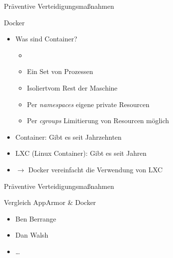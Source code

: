 \begin{frame}{Präventive Verteidigungsmaßnahmen}
        \begin{block}{Docker}
                \begin{itemize}[<+->]
                        \item Was sind Container?
                        \begin{itemize}[<+->]
                                \item \textbf{}
                                \item Ein Set von Prozessen
                                \item Isoliert\footnotemark vom Rest der Maschine
                                \item Per \textit{namespaces} eigene private Resourcen
                                \item Per \textit{cgroups} Limitierung von Resourcen möglich
                        \end{itemize}
                        \item Container: Gibt es seit Jahrzehnten
                        \item LXC (Linux Container): Gibt es seit Jahren
                        \item $\rightarrow$ Docker vereinfacht die Verwendung von LXC 
                \end{itemize}
        \end{block}

\end{frame}

\begin{frame}{Präventive Verteidigungsmaßnahmen}
        \begin{block}{Vergleich AppArmor \& Docker}
                \begin{itemize}[<+->]
                        \item {} Ben Berrange
                        \item {} Dan Walsh
                        \item \dots
                \end{itemize}
        \end{block}
\end{frame}

